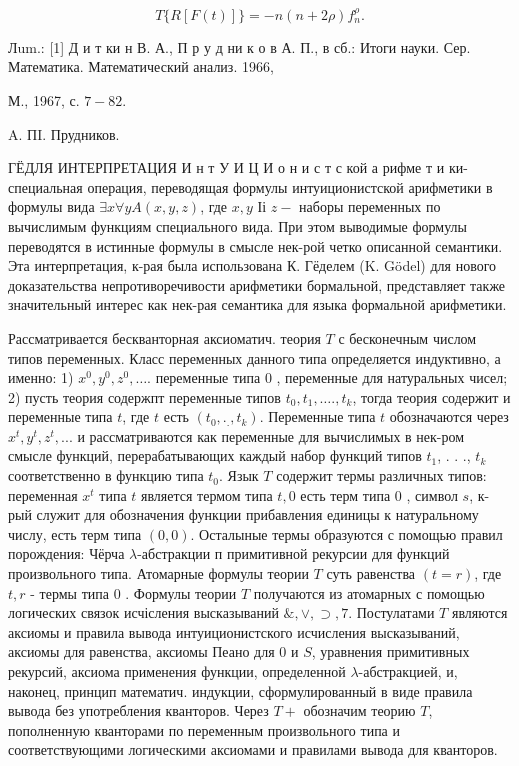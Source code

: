 \documentclass[10pt]{article}
\begin{document}
\[

T\{R[F(t)]\}=-n(n+2 \rho) f_{n}^{\rho} .

\]



Лum.: [1] Д и т ки н В. А., П р у д ни к о в А. П., в сб.: Итоги науки. Сер. Математика. Математический анализ. 1966,

М., 1967, с. $7-82$.

A. ПI. Прудников.



ГЁДЛЯ ИНТЕРПРЕТАЦИЯ И н т У И Ц И о н и с т с кой а рифме т и ки-специальная операция, переводящая формулы интуиционистской арифметики в формулы вида $\exists x \forall y A(x, y, z)$, где $x, y$ Іі $z-$ наборы переменных по вычислимым функциям специального вида. При этом выводимые формулы переводятся в истинные формулы в смысле нек-рой четко описанной семантики. Эта интерпретация, к-рая была использована К. Гёделем (K. Gödel) для нового доказательства непротиворечивости арифметики бормальной, представляет также значительный интерес как нек-рая семантика для языка формальной арифметики.



Рассматривается бескванторная аксиоматич. теория $T$ с бесконечным числом типов переменных. Класс переменных данного типа определяется индуктивно, а именно: 1) $x^{0}, y^{0}, z^{0}, \ldots$. переменные типа 0 , переменные для натуральных чисел; 2) пусть теория содержпт переменные типов $t_{0}, t_{1}, \ldots ., t_{k}$, тогда теория содержит и переменные типа $t$, где $t$ есть $\left(t_{0}, ._{.}, t_{k}\right)$. Переменные типа $t$ обозначаются через $x^{t}, y^{t}, z^{t}, . .$. и рассматриваются как переменные для вычислимых в нек-ром смысле функций, перерабатывающих каждый набор функций типов $t_{1}$, . . ., $t_{k}$ соответственно в функцию типа $t_{0}$. Язык $T$ содержит термы различных типов: переменная $x^{t}$ типа $t$ является термом типа $t, 0$ есть терм типа 0 , символ $s$, к-рый служит для обозначения функции прибавления единицы к натуральному числу, есть терм типа $(0,0)$. Осталыные термы образуются с помощью правил порождения: Чёрча $\lambda$-абстракции п примитивной рекурсии для функций произвольного типа. Атомарные формулы теории $T$ суть равенства $(t=r)$, где $t, r$ - термы типа 0 . Формулы теории $T$ получаются из атомарных с помощью логических связок исчісления высказываний $\&, \vee, \supset, 7$. Постулатами $T$ являются аксиомы и правила вывода интуиционистского исчисления высказываний, аксиомы для равенства, аксиомы Пеано для 0 и $S$, уравнения примитивных рекурсий, аксиома применения функции, определенной $\lambda$-абстракцией, и, наконец, принцип математич. индукции, сформулированный в виде правила вывода без употребления кванторов. Через $T+$ обозначим теорию $T$, пополненную кванторами по переменным произвольного типа и соответствующими логическими аксиомами и правилами вывода для кванторов.
\end{document}
